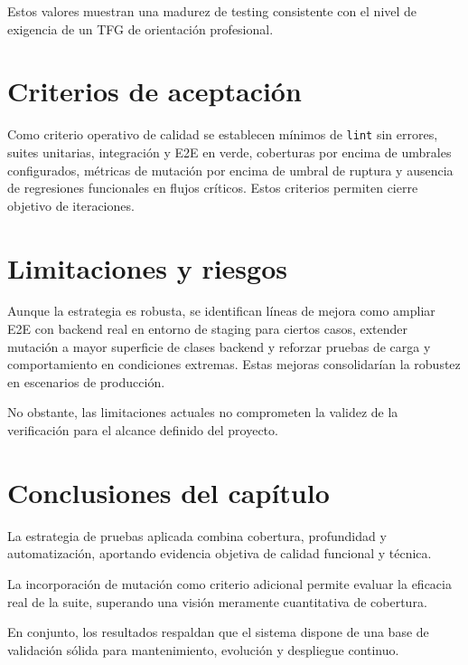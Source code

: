 Estos valores muestran una madurez de testing consistente con el nivel de exigencia
de un TFG de orientaci\'on profesional.

\FloatBarrier
\section{Criterios de aceptaci\'on}

Como criterio operativo de calidad se establecen m\'inimos de \texttt{lint} sin errores, suites unitarias, integraci\'on y E2E en verde, coberturas por encima de umbrales configurados, m\'etricas de mutaci\'on por encima de umbral de ruptura y ausencia de regresiones funcionales en flujos cr\'iticos. Estos criterios permiten cierre objetivo de iteraciones.

\FloatBarrier
\section{Limitaciones y riesgos}

Aunque la estrategia es robusta, se identifican l\'ineas de mejora como ampliar E2E con backend real en entorno de staging para ciertos casos, extender mutaci\'on a mayor superficie de clases backend y reforzar pruebas de carga y comportamiento en condiciones extremas. Estas mejoras consolidar\'ian la robustez en escenarios de producci\'on.

No obstante, las limitaciones actuales no comprometen la validez de la verificaci\'on
para el alcance definido del proyecto.

\FloatBarrier
\section{Conclusiones del cap\'itulo}

La estrategia de pruebas aplicada combina cobertura, profundidad y automatizaci\'on,
aportando evidencia objetiva de calidad funcional y t\'ecnica.

La incorporaci\'on de mutaci\'on como criterio adicional permite evaluar
la eficacia real de la suite, superando una visi\'on meramente cuantitativa
de cobertura.

En conjunto, los resultados respaldan que el sistema dispone de una base
de validaci\'on s\'olida para mantenimiento, evoluci\'on y despliegue continuo.






